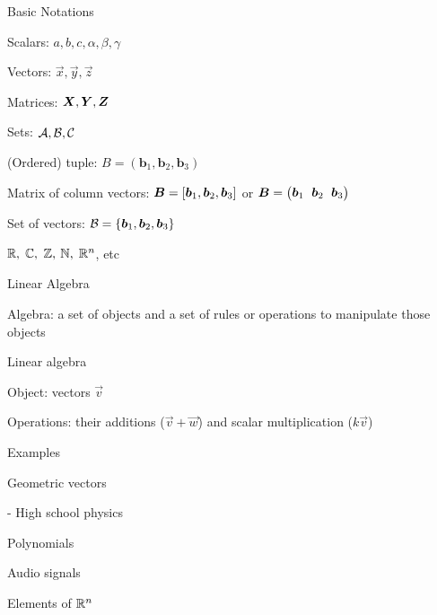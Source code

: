 \documentclass[fleqn,aspectratio=169]{beamer}
\begin{document}
\begin{frame}{Basic Notations}

\plitemsep 0.1in

\bci 
\item Scalars: $a,b,c,\alpha,\beta,\gamma$

\item Vectors: $\vec{x},\vec{y},\vec{z}$

\item Matrices: $\bm{X},\bm{Y},\bm{Z}$

\item Sets: $\mathcal A, \mathcal B, \mathcal C$

\item (Ordered) tuple: $B=(\bm{b}_1, \bm{b}_2, \bm{b}_3)$

\item Matrix of column vectors: $\bm{B} = [\bm{b}_1, \bm{b}_2, \bm{b}_3]$ or 
$\mB = \rowvec{\vb_1 & \vb_2 & \vb_3}$

\item Set of vectors:  $\mathcal B = \{\bm{b}_1, \bm{b}_2, \bm{b}_3 \}$

\item ${\mathbb R},$ ${\mathbb C},$ ${\mathbb Z},$ ${\mathbb N},$ ${\mathbb R}^n$, etc
\eci
\end{frame}

\begin{frame}{Linear Algebra}

\plitemsep 0.1in

\bci 
\item Algebra: a set of objects and a set of rules or operations to manipulate those objects

\item Linear algebra
\plitemsep 0.05in
\bci
\item Object: vectors $\vec{v}$
\item Operations: their additions ($\vec{v} + \vec{w}$) and scalar multiplication ($k\vec{v}$)
\eci

\item Examples

{
\bci
\item Geometric vectors

- High school physics
\item Polynomials
\item Audio signals
\item Elements of ${\mathbb R}^n$
\eci
}
{
\centering
{}
}

\eci
\end{frame}
\end{document}

